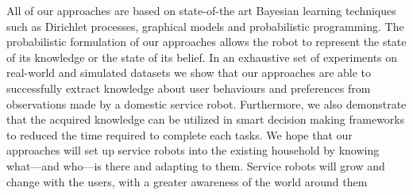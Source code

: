 All of our approaches are based on state-of-the art Bayesian learning techniques such as Dirichlet processes, graphical models and probabilistic programming. The probabilistic formulation of our approaches allows the robot to represent the state of its knowledge or the state of its belief. In an exhaustive set of experiments on real-world and simulated datasets we show that our approaches are able to successfully extract knowledge about user behaviours and preferences from observations made by a domestic service robot. Furthermore, we also demonstrate that the acquired knowledge can be utilized in smart decision making frameworks to reduced the time required to complete each tasks. We hope that our approaches will set up service robots into the existing household by knowing what—and who—is there and adapting to them. Service robots will grow and change with the users, with a greater awareness of the world around them

